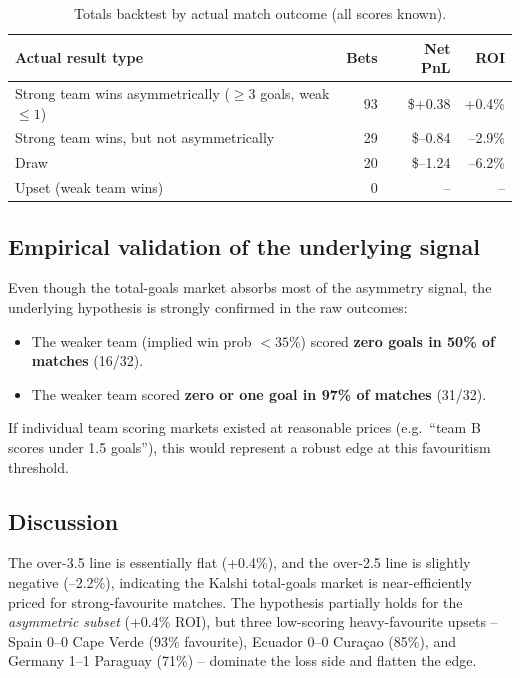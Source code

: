 \documentclass[11pt, a4paper]{article}
\begin{document}
\begin{table}[h!]
\centering
\caption{Totals backtest by actual match outcome (all scores known).}
\begin{tabular}{lrrr}
\toprule
Actual result type & Bets & Net PnL & ROI \\
\midrule
Strong team wins asymmetrically ($\geq 3$ goals, weak $\leq 1$) & 93 & \$+0.38 & +0.4\% \\
Strong team wins, but not asymmetrically & 29 & \$--0.84 & --2.9\% \\
Draw & 20 & \$--1.24 & --6.2\% \\
Upset (weak team wins) & 0 & -- & -- \\
\bottomrule
\end{tabular}
\end{table}

\subsection{Empirical validation of the underlying signal}

Even though the total-goals market absorbs most of the asymmetry signal,
the underlying hypothesis is strongly confirmed in the raw outcomes:

\begin{itemize}
  \item The weaker team (implied win prob $< 35\%$) scored \textbf{zero
        goals in 50\% of matches} (16/32).
  \item The weaker team scored \textbf{zero or one goal in 97\% of
        matches} (31/32).
\end{itemize}

If individual team scoring markets existed at reasonable prices (e.g.\
``team B scores under 1.5 goals''), this would represent a robust edge at
this favouritism threshold.

\subsection{Discussion}

The over-3.5 line is essentially flat (+0.4\%), and the over-2.5 line is
slightly negative (--2.2\%), indicating the Kalshi total-goals market is
near-efficiently priced for strong-favourite matches.
The hypothesis partially holds for the \textit{asymmetric subset}
(+0.4\% ROI), but three low-scoring heavy-favourite upsets -- Spain 0--0
Cape Verde (93\% favourite), Ecuador 0--0 Cura\c{c}ao (85\%), and
Germany 1--1 Paraguay (71\%) -- dominate the loss side and flatten
the edge.
\end{document}
